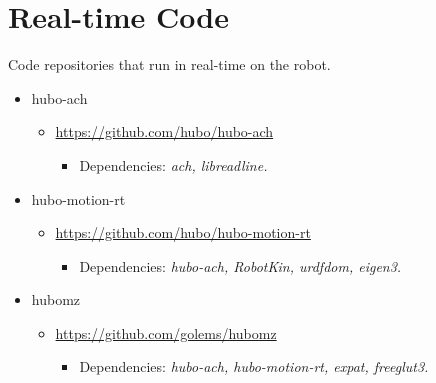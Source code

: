 \documentclass[letterpaper, 10 pt]{report}
\begin{document}
\section{Real-time Code}
Code repositories that run in real-time on the robot.
\begin{itemize}
\item hubo-ach
  \begin{itemize}
	\item \url{https://github.com/hubo/hubo-ach}
	  \begin{itemize}
	    \item Dependencies: \textit{ach, libreadline.}
	  \end{itemize}
  \end{itemize}
\item hubo-motion-rt
	\begin{itemize}
	\item \url{https://github.com/hubo/hubo-motion-rt}
	  \begin{itemize}
	    \item Dependencies: \textit{hubo-ach, RobotKin, urdfdom, eigen3.}
	  \end{itemize}
  \end{itemize}
\item hubomz
  \begin{itemize}
	\item \url{https://github.com/golems/hubomz}
	  \begin{itemize}
	    \item Dependencies: \textit{hubo-ach, hubo-motion-rt, expat, freeglut3.} 
	  \end{itemize}
  \end{itemize}
\end{itemize}
\end{document}
